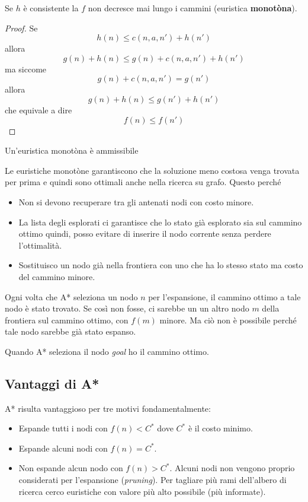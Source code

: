 \begin{theorem}
	Se $h$ \`e consistente la $f$ non decresce mai lungo i cammini (euristica
	\textbf{monot\`ona}).
	\begin{proof}
		Se \[ h(n) \leq c(n, a, n') + h(n') \] allora
		\[ g(n) + h(n) \leq g(n) + c(n, a, n') + h(n') \]
		ma siccome
		\[ g(n) + c(n, a, n') = g(n') \] allora
		\[ g(n) + h(n) \leq g(n') + h(n') \] che equivale a dire
		\[ f(n) \leq f(n') \]
	\end{proof}
\end{theorem}

\begin{theorem}
	Un'euristica monot\`ona \`e ammissibile
\end{theorem}
Le euristiche monot\`one garantiscono che la soluzione meno costosa venga trovata per prima
e quindi sono ottimali anche nella ricerca su grafo. Questo perch\'e
\begin{itemize}
	\item Non si devono recuperare tra gli antenati nodi con costo minore.
	\item La lista degli esplorati ci garantisce che lo stato gi\`a esplorato sia sul cammino
	      ottimo quindi, posso evitare di inserire il nodo corrente senza perdere
	      l'ottimalit\`a.
	\item Sostituisco un nodo gi\`a nella frontiera con uno che ha lo stesso stato ma costo
	      del cammino minore.
\end{itemize}
Ogni volta che A* seleziona un nodo $n$ per l'espansione, il cammino ottimo a tale nodo \`e stato
trovato. Se cos\`i non fosse, ci sarebbe un un altro nodo $m$ della frontiera sul cammino
ottimo, con $f(m)$ minore. Ma ci\`o non \`e possibile perch\'e tale nodo sarebbe gi\`a stato
espanso.

Quando A* seleziona il nodo \emph{goal} ho il cammino ottimo.

\subsection{Vantaggi di A*}
A* risulta vantaggioso per tre motivi fondamentalmente:
\begin{itemize}
	\item Espande tutti i nodi con $f(n) < C^*$ dove $C^*$ \`e il costo minimo.
	\item Espande alcuni nodi con $f(n) = C^*$.
	\item Non espande alcun nodo con $f(n) > C^*$. Alcuni nodi non vengono proprio considerati
	      per l'espansione (\emph{pruning}). Per tagliare pi\`u rami dell'albero di ricerca cerco
	      euristiche con valore pi\`u alto possibile (pi\`u informate).
\end{itemize}

